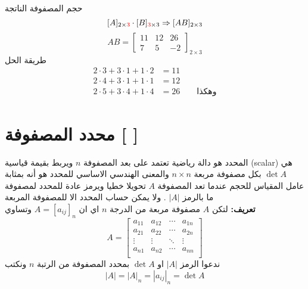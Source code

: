 حجم المصفوفة الناتجة 
\[
[A]_{2\times \textcolor{red}{3}}\cdot [B]_{\textcolor{red}{3}\times 3} \Rightarrow [AB]_{2\times 3}
\]
\[
AB = 
\begin{bmatrix}
	11& 12& 26\\
	7 &5& -2 
\end{bmatrix}_{2\times 3}
\]
طريقة الحل 
\begin{align*}
	2\cdot3 + 3\cdot1 +1\cdot2&=11\\
	2\cdot4 + 3\cdot1 + 1\cdot1 &= 12\\
	2\cdot5 + 3\cdot4 + 1\cdot 4&= 26 \qquad \text{وهكذا}
\end{align*}

\section{محدد المصفوفة [ ]}
المحدد هو دالة رياضية تعتمد على بعد المصفوفة $n$ ويربط بقيمة قياسية (scalar) هي $\det A$ بكل مصفوفة مربعة $n\times n$ والمعنى الهندسي الاساسي للمحدد هو أنه بمثابة عامل المقياس للحجم عندما تعد المصفوفة $A$ تحويلا خطيا ويرمز عادة للمحدد لمصفوفة ما بالرمز $|A|$ . ولا يمكن حساب المحدد الا للمصفوفة المربعة\\ [10pt]
\noindent
\textbf{تعريف:} لتكن $A$ مصفوفة مربعة من الدرجة $n$ اي ان $A=[a_{ij}]_n$ وتساوي
\[
A =
\begin{bmatrix}
	a_{11} & a_{12} & \cdots & a_{1n}\\
	a_{21} & a_{22} & \cdots & a_{2n}\\
		\vdots & \vdots & \ddots & \vdots\\
	a_{n1} & a_{n2} & \cdots & a_{nn}\\
\end{bmatrix}
\] 
ندعوا الرمز $|A|$ او $\det A$ بمحدد المصفوفة من الرتبة $n$ ونكتب
\[
|A| = |A|_n = |a_{ij}|_{n} = \det A
\]

